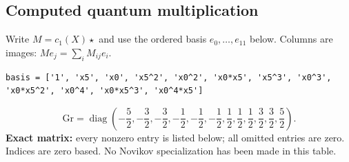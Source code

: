 \documentclass[10pt,a4paper]{article}
\begin{document}
\subsection*{Computed quantum multiplication}
Write $M=c_1(X)\star$ and use the ordered basis $e_0,\ldots,e_{11}$ below. Columns are images: $M e_j=\sum_i M_{ij}e_i$.
\begin{lstlisting}
basis = ['1', 'x5', 'x0', 'x5^2', 'x0^2', 'x0*x5', 'x5^3', 'x0^3', 'x0*x5^2', 'x0^4', 'x0*x5^3', 'x0^4*x5']
\end{lstlisting}
\[\mathrm{Gr}=\operatorname{diag}\!\left(- \frac{5}{2},- \frac{3}{2},- \frac{3}{2},- \frac{1}{2},- \frac{1}{2},- \frac{1}{2},\frac{1}{2},\frac{1}{2},\frac{1}{2},\frac{3}{2},\frac{3}{2},\frac{5}{2}\right).\]
\textbf{Exact matrix:} every nonzero entry is listed below; all omitted entries are zero. Indices are zero based. No Novikov specialization has been made in this table.
\end{document}
